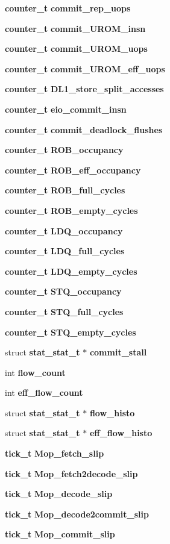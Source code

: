 \begin{CompactItemize}
\item 
{\bf counter\_\-t} {\bf commit\_\-rep\_\-uops}
\item 
{\bf counter\_\-t} {\bf commit\_\-UROM\_\-insn}
\item 
{\bf counter\_\-t} {\bf commit\_\-UROM\_\-uops}
\item 
{\bf counter\_\-t} {\bf commit\_\-UROM\_\-eff\_\-uops}
\item 
{\bf counter\_\-t} {\bf DL1\_\-store\_\-split\_\-accesses}
\item 
{\bf counter\_\-t} {\bf eio\_\-commit\_\-insn}
\item 
{\bf counter\_\-t} {\bf commit\_\-deadlock\_\-flushes}
\item 
{\bf counter\_\-t} {\bf ROB\_\-occupancy}
\item 
{\bf counter\_\-t} {\bf ROB\_\-eff\_\-occupancy}
\item 
{\bf counter\_\-t} {\bf ROB\_\-full\_\-cycles}
\item 
{\bf counter\_\-t} {\bf ROB\_\-empty\_\-cycles}
\item 
{\bf counter\_\-t} {\bf LDQ\_\-occupancy}
\item 
{\bf counter\_\-t} {\bf LDQ\_\-full\_\-cycles}
\item 
{\bf counter\_\-t} {\bf LDQ\_\-empty\_\-cycles}
\item 
{\bf counter\_\-t} {\bf STQ\_\-occupancy}
\item 
{\bf counter\_\-t} {\bf STQ\_\-full\_\-cycles}
\item 
{\bf counter\_\-t} {\bf STQ\_\-empty\_\-cycles}
\item 
struct {\bf stat\_\-stat\_\-t} $\ast$ {\bf commit\_\-stall}
\item 
int {\bf flow\_\-count}
\item 
int {\bf eff\_\-flow\_\-count}
\item 
struct {\bf stat\_\-stat\_\-t} $\ast$ {\bf flow\_\-histo}
\item 
struct {\bf stat\_\-stat\_\-t} $\ast$ {\bf eff\_\-flow\_\-histo}
\item 
{\bf tick\_\-t} {\bf Mop\_\-fetch\_\-slip}
\item 
{\bf tick\_\-t} {\bf Mop\_\-fetch2decode\_\-slip}
\item 
{\bf tick\_\-t} {\bf Mop\_\-decode\_\-slip}
\item 
{\bf tick\_\-t} {\bf Mop\_\-decode2commit\_\-slip}
\item 
{\bf tick\_\-t} {\bf Mop\_\-commit\_\-slip}
\item 

\end{CompactItemize}
